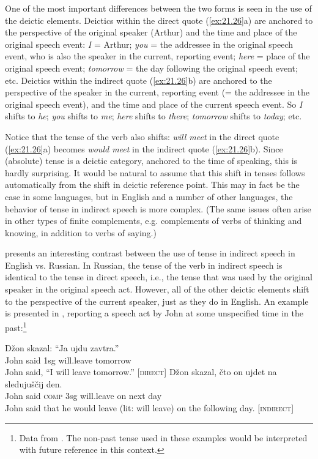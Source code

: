 One of the most important differences between the two forms is seen in the use of the deictic elements. Deictics within the direct quote (\ref{ex:21.26}a) are anchored to the perspective of the original speaker (Arthur) and the time and place of the original speech event: \textit{I} = Arthur; \textit{you} = the addressee in the original speech event, who is also the speaker in the current, reporting event; \textit{here} = place of the original speech event; \textit{tomorrow} = the day following the original speech event; etc. Deictics within the indirect quote (\ref{ex:21.26}b) are anchored to the perspective of the speaker in the current, reporting event (= the addressee in the original speech event), and the time and place of the current speech event. So \textit{I} shifts to \textit{he}; \textit{you} shifts to \textit{me}; \textit{here} shifts to \textit{there}; \textit{tomorrow} shifts to \textit{today}; etc.



Notice that the tense of the verb also shifts: \textit{will meet} in the direct quote (\ref{ex:21.26}a) becomes \textit{would meet} in the indirect quote (\ref{ex:21.26}b). Since (absolute) tense is a deictic category, anchored to the time of speaking, this is hardly surprising. It would be natural to assume that this shift in tenses follows automatically from the shift in deictic reference point. This may in fact be the case in some languages, but in English and a number of other languages, the behavior of tense in indirect speech is more complex. (The same issues often arise in other types of finite complements, e.g. complements of verbs of thinking and knowing, in addition to verbs of saying.)



\citet{Comrie1985} presents an interesting contrast between the use of tense in indirect speech in English vs. Russian. In Russian, the tense of the verb in indirect speech is identical to the tense in direct speech, i.e., the tense that was used by the original speaker in the original speech act. However, all of the other deictic elements shift to the perspective of the current speaker, just as they do in English. An example is presented in , reporting a speech act by John at some unspecified time in the past:\footnote{Data from \citet[109]{Comrie1985}. The non-past tense used in these examples would be interpreted with future reference in this context.}


\ea \label{ex:21.27}
\ea   \gll Džon  skazal:  “Ja  ujdu  zavtra.”\\
John  said  1sg  will.leave  tomorrow\\
\glt John said, “I will leave tomorrow.”  [\textsc{direct}]
\ex \gll Džon  skazal,  čto  on  ujdet  na  sledujuščij  den.\\
John  said  \textsc{comp}  3sg  will.leave  on  next  day\\
\glt John said that he would leave (lit: will leave) on the following day.  [\textsc{indirect}]
\z \z


